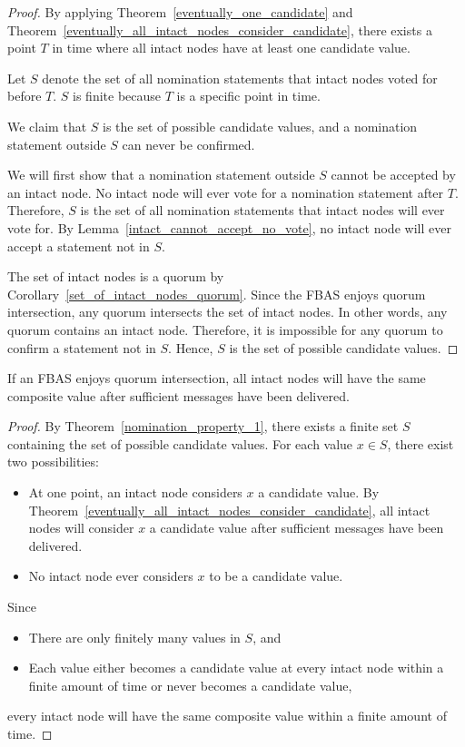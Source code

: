 \begin{proof}
    By applying Theorem~\ref{eventually_one_candidate} and Theorem~\ref{eventually_all_intact_nodes_consider_candidate},
    there exists a point $T$ in time where all intact nodes have at least one candidate value.

    Let $S$ denote the set of all nomination statements that intact nodes voted for before $T$.
    $S$ is finite because $T$ is a specific point in time.

    We claim that $S$ is the set of possible candidate values, and a nomination statement outside $S$ can never be confirmed.

    We will first show that a nomination statement outside $S$ cannot be accepted by an intact node.
    No intact node will ever vote for a nomination statement after $T$.
    Therefore, $S$ is the set of all nomination statements that intact nodes will ever vote for.
    By Lemma~\ref{intact_cannot_accept_no_vote}, no intact node will ever accept a statement not in $S$.

    The set of intact nodes is a quorum by Corollary~\ref{set_of_intact_nodes_quorum}.
    Since the FBAS enjoys quorum intersection, any quorum intersects the set of intact nodes.
    In other words, any quorum contains an intact node.
    Therefore, it is impossible for any quorum to confirm a statement not in $S$.
    Hence, $S$ is the set of possible candidate values.
\end{proof}

\begin{thm}\label{nominiation_protocol_convergence}
    If an FBAS enjoys quorum intersection, all intact nodes will have the same composite value after sufficient messages have been delivered.
\end{thm}

\begin{proof}
    By Theorem~\ref{nomination_property_1}, there exists a finite set $S$ containing the set of possible candidate values.
    For each value $x \in S$, there exist two possibilities:
    \begin{itemize}
        \item
            At one point, an intact node considers $x$ a candidate value.
            By Theorem~\ref{eventually_all_intact_nodes_consider_candidate}, all intact nodes will consider $x$ a candidate value after sufficient messages have been delivered.
        \item
            No intact node ever considers $x$ to be a candidate value.
    \end{itemize}
    Since
    \begin{itemize}
        \item
            There are only finitely many values in $S$, and
        \item
            Each value either becomes a candidate value at every intact node within a finite amount of time or never becomes a candidate value,
    \end{itemize}
    every intact node will have the same composite value within a finite amount of time.
\end{proof}


